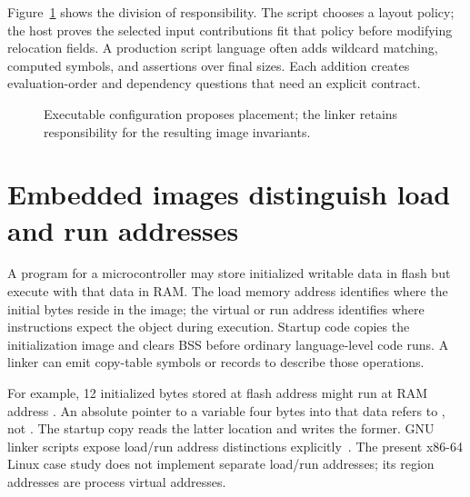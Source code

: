 Figure~\ref{fig:ch58-policy} shows the division of responsibility.
The script chooses a layout policy; the host proves the selected input contributions fit that policy before modifying relocation fields.
A production script language often adds wildcard matching, computed symbols, and assertions over final sizes.
Each addition creates evaluation-order and dependency questions that need an explicit contract.

\begin{figure}[htbp]
\centering
{}
\caption{Executable configuration proposes placement; the linker retains responsibility for the resulting image invariants.}
\label{fig:ch58-policy}
\end{figure}

\section{Embedded images distinguish load and run addresses}
\label{sec:ch58-lma}

A program for a microcontroller may store initialized writable data in flash but execute with that data in RAM.
The load memory address identifies where the initial bytes reside in the image; the virtual or run address identifies where instructions expect the object during execution.
Startup code copies the initialization image and clears BSS before ordinary language-level code runs.
A linker can emit copy-table symbols or records to describe those operations.

For example, 12 initialized bytes stored at flash address  might run at RAM address .
An absolute pointer to a variable four bytes into that data refers to , not .
The startup copy reads the latter location and writes the former.
GNU linker scripts expose load/run address distinctions explicitly~\cite{gnu-2026-ld}.
The present x86-64 Linux case study does not implement separate load/run addresses; its region addresses are process virtual addresses.

